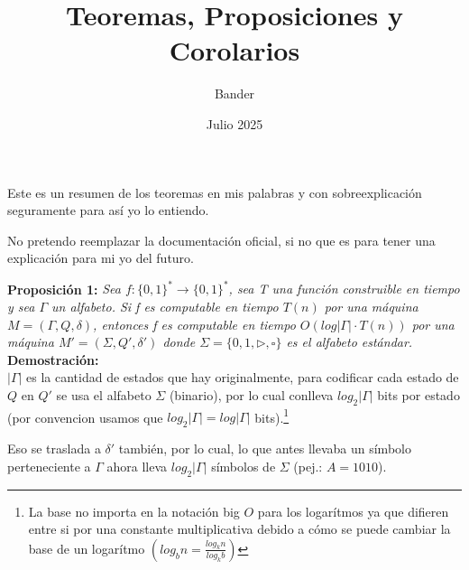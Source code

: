 \documentclass{article}
\title{Teoremas, Proposiciones y Corolarios}
\author{Bander}
\date{Julio 2025}
\begin{document}
\maketitle

\begin{flushleft}
  Este es un resumen de los teoremas en mis palabras y con sobreexplicación seguramente para así 
  yo lo entiendo. 

  No pretendo reemplazar la documentación oficial, si no que es para tener una explicación para 
  mi yo del futuro.
\end{flushleft}

\pagebreak

\begin{flushleft}
  \textbf{Proposición 1:} 
  \textit{Sea $f : \{0,1\}^* \rightarrow \{0,1\}^*$, sea T una función construible en
  tiempo y sea $\Gamma$ un alfabeto. Si f es computable en tiempo $T(n)$ por una máquina $M = 
  (\Gamma, Q, \delta)$, entonces f es computable en tiempo $O(log|\Gamma| \cdot T(n))$ por 
  una máquina $M' = (\Sigma, Q', \delta')$ donde $\Sigma = \{0,1,\triangleright, \square \}$
  es el alfabeto estándar.}\\[0.5em]

  \textbf{\textcolor{Mulberry}{Demostración:}} \\[0.5em]

  $|\Gamma|$ es la cantidad de estados que hay originalmente, para codificar cada estado de $Q$
  en $Q'$ se usa el alfabeto $\Sigma$ (binario), por lo cual conlleva $log_2|\Gamma|$ bits por
  estado (por convencion usamos que $log_2|\Gamma| = log|\Gamma|$ bits).\footnote{La base  no importa en la notación big $O$ para los logarítmos ya que difieren entre
  si por una constante multiplicativa debido a cómo se puede cambiar la base de un logarítmo 
  $(log_b n = \frac{log_k n}{log_k b})$}

  Eso se traslada a $\delta'$  también, por lo cual, lo que antes llevaba un símbolo perteneciente a 
  $\Gamma$ ahora lleva $log_2|\Gamma|$ símbolos de $\Sigma$ (pej.: $A = 1010$).
\end{flushleft}
\end{document}
